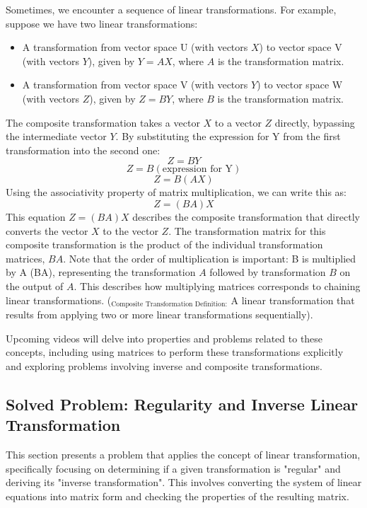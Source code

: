 \documentclass{article}
\begin{document}
Sometimes, we encounter a sequence of linear transformations. For example, suppose we have two linear transformations:
\begin{itemize}
    \item A transformation from vector space U (with vectors $X$) to vector space V (with vectors $Y$), given by $Y = AX$, where $A$ is the transformation matrix.
    \item A transformation from vector space V (with vectors $Y$) to vector space W (with vectors $Z$), given by $Z = BY$, where $B$ is the transformation matrix.
\end{itemize}
The composite transformation takes a vector $X$ to a vector $Z$ directly, bypassing the intermediate vector $Y$. By substituting the expression for Y from the first transformation into the second one:
\[ Z = B Y \]
\[ Z = B (\text{expression for Y}) \]
\[ Z = B (A X) \]
Using the associativity property of matrix multiplication, we can write this as:
\[ Z = (BA) X \]
This equation $Z = (BA)X$ describes the composite transformation that directly converts the vector $X$ to the vector $Z$. The transformation matrix for this composite transformation is the product of the individual transformation matrices, $BA$. Note that the order of multiplication is important: B is multiplied by A (BA), representing the transformation $A$ followed by transformation $B$ on the output of $A$. This describes how multiplying matrices corresponds to chaining linear transformations.
($_{\text{Composite Transformation Definition:}}$ A linear transformation that results from applying two or more linear transformations sequentially).

Upcoming videos will delve into properties and problems related to these concepts, including using matrices to perform these transformations explicitly and exploring problems involving inverse and composite transformations.


\subsection{Solved Problem: Regularity and Inverse Linear Transformation} %

This section presents a problem that applies the concept of linear transformation, specifically focusing on determining if a given transformation is "regular" and deriving its "inverse transformation". This involves converting the system of linear equations into matrix form and checking the properties of the resulting matrix.
\end{document}
